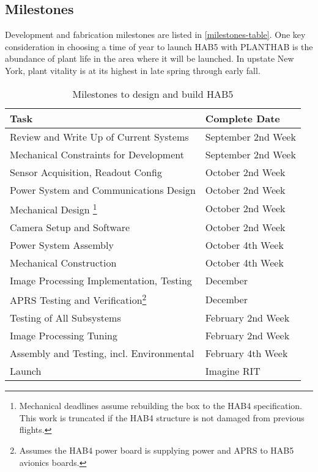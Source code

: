 \documentclass[conference]{IEEEtran} %
\begin{document}
\subsection{Milestones}
Development and fabrication milestones are listed in \autoref{milestones-table}.
One key consideration in choosing a time of year to launch HAB5 with PLANTHAB is the abundance of plant life in the area where it will be launched.
In upstate New York, plant vitality is at its highest in late spring through early fall.

\begin{table}[!ht]
  \centering
  \caption{Milestones to design and build HAB5}

\begin{minipage}{.45\textwidth}
  \noindent
  \begin{tabular}{@{}ll@{}}

  \label{milestones-table}
    \textbf{Task} & \textbf{Complete Date} \\
    \midrule
    Review and Write Up of Current Systems & September 2nd Week \\
    Mechanical Constraints for Development & September 2nd Week \\
    Sensor Acquisition, Readout Config & October 2nd Week \\
    Power System and Communications Design & October 2nd Week \\
    Mechanical Design \footnote{Mechanical deadlines assume rebuilding the box to the HAB4 specification. This work is truncated if the HAB4 structure is not damaged from previous flights.} & October 2nd Week \\
    Camera Setup and Software & October 2nd Week \\
    Power System Assembly & October 4th Week \\
    Mechanical Construction & October 4th Week \\
    Image Processing Implementation, Testing & December \\
    APRS Testing and Verification\footnote{Assumes the HAB4 power board is supplying power and APRS to HAB5 avionics boards.} & December \\
    Testing of All Subsystems & February 2nd Week \\
    Image Processing Tuning & February 2nd Week \\
    Assembly and Testing, incl. Environmental & February 4th Week \\
    Launch & Imagine RIT \\
  \end{tabular}
\end{minipage}
\end{table}
\end{document}
